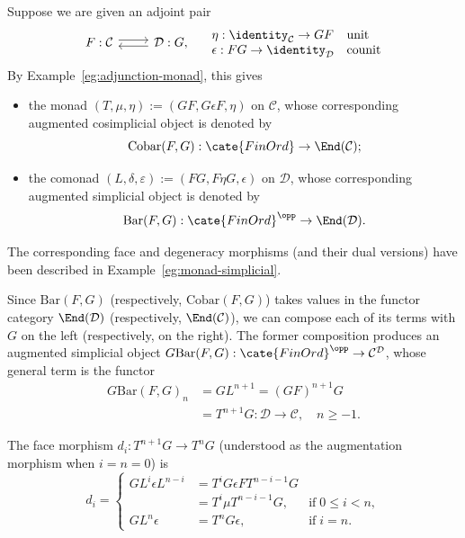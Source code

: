 \begin{example}\label{eg:bar-adjunction}
	Suppose we are given an adjoint pair
	\[\begin{tikzcd}
		F : \mathcal{C} \arrow[shift left, r] & \mathcal{D}: G \arrow[shift left, l] ,
	\end{tikzcd} \quad \begin{array}{ll}
		\eta: \identity_{\mathcal{C}} \to GF & \text{unit} \\
		\epsilon: FG \to \identity_{\mathcal{D}} & \text{counit}
	\end{array}\]
	By Example~\ref{eg:adjunction-monad}, this gives
	\begin{itemize}
		\item the monad $(T,\mu,\eta):=(GF,G\epsilon F,\eta)$ on
		$\mathcal{C}$, whose corresponding augmented cosimplicial object is
		denoted by
		\[ \mathrm{Cobar}(F, G): \cate{FinOrd} \to \End(\mathcal{C}); \]
		\item the comonad $(L,\delta,\varepsilon):=(FG,F\eta G,\epsilon)$ on
		$\mathcal{D}$, whose corresponding augmented simplicial object is
		denoted by
		\[ \mathrm{Bar}(F, G): \cate{FinOrd}^{\opp} \to \End(\mathcal{D}). \]
	\end{itemize}
	The corresponding face and degeneracy morphisms (and their dual versions)
	have been described in Example~\ref{eg:monad-simplicial}.

	Since $\mathrm{Bar}(F,G)$ (respectively, $\mathrm{Cobar}(F,G)$) takes
	values in the functor category $\End(\mathcal{D})$ (respectively,
	$\End(\mathcal{C})$), we can compose each of its terms with $G$ on the
	left (respectively, on the right). The former composition produces an
	augmented simplicial object
	$G\mathrm{Bar}(F,G):\cate{FinOrd}^{\opp}\to
	\mathcal{C}^{\mathcal{D}}$, whose general term is the functor
	\begin{align*}
		G\mathrm{Bar}(F, G)_n & = GL^{n+1} = (GF)^{n+1} G \\
		& = T^{n+1}G: \mathcal{D} \to \mathcal{C}, \quad n \geq -1.
	\end{align*}

	The face morphism $d_i:T^{n+1}G\to T^nG$ (understood as the augmentation
	morphism when $i=n=0$) is
	\[d_i = \left\{\begin{array}{rll}
		G L^i \epsilon L^{n-i} & = T^i G \epsilon F T^{n-i-1} G & \\
		& = T^i \mu T^{n-i-1} G, & \text{if}\; 0 \leq i < n, \\
		G L^n \epsilon & = T^n G \epsilon , & \text{if}\; i = n.
	\end{array}\right.\]


\end{example}

